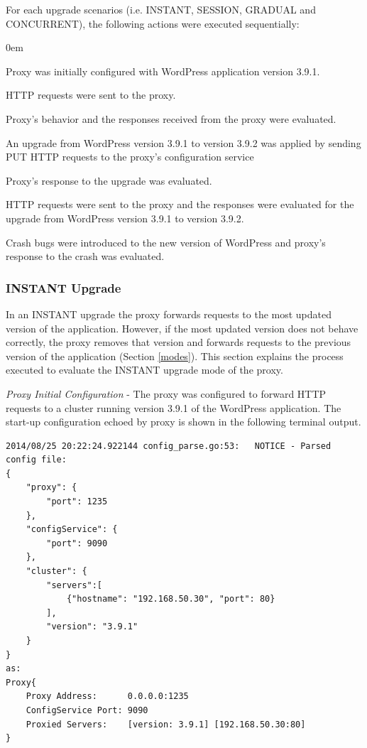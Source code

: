 \documentclass[a4paper,11pt,twoside]{report}
\begin{document}
For each upgrade scenarios (i.e. INSTANT, SESSION, GRADUAL and CONCURRENT), the following actions were executed sequentially:

\begin{list}{-}{}
  \itemsep0em
  \item Proxy was initially configured with WordPress application version 3.9.1. 
  \item HTTP requests were sent to the proxy.
  \item Proxy's behavior and the responses received from the proxy  were evaluated. 
  \item An upgrade from WordPress version 3.9.1 to version 3.9.2 was applied by sending PUT HTTP requests to the proxy's configuration service
  \item Proxy's response to the upgrade was evaluated.
  \item HTTP requests were sent to the proxy and the responses were evaluated for the upgrade from WordPress version 3.9.1 to version 3.9.2.
  \item Crash bugs were introduced to the new version of WordPress and proxy's response to the crash was evaluated.
\end{list} 

\subsubsection*{INSTANT Upgrade}
In an INSTANT upgrade the proxy  forwards requests to the most updated version of the application. However, if the most updated version does not behave correctly, the proxy removes that version and forwards requests to the previous version of the application (Section \ref{modes}). This section explains the process executed to evaluate the INSTANT upgrade mode of the proxy.\medskip

\noindent
\textit{Proxy Initial Configuration} - The proxy was configured to forward HTTP requests to a cluster running version 3.9.1 of the WordPress application. The start-up configuration echoed by proxy is shown in the following terminal output.\smallskip

\begin{lstlisting}[language=terminal]
2014/08/25 20:22:24.922144 config_parse.go:53:   NOTICE - Parsed config file:
{
    "proxy": {
        "port": 1235
    },
    "configService": {
        "port": 9090
    },
    "cluster": {
        "servers":[
            {"hostname": "192.168.50.30", "port": 80}
        ],
        "version": "3.9.1"
    }
}
as:
Proxy{
	Proxy Address:      0.0.0.0:1235
	ConfigService Port: 9090
	Proxied Servers:    [version: 3.9.1] [192.168.50.30:80]
}   
\end{lstlisting}
\end{document}
